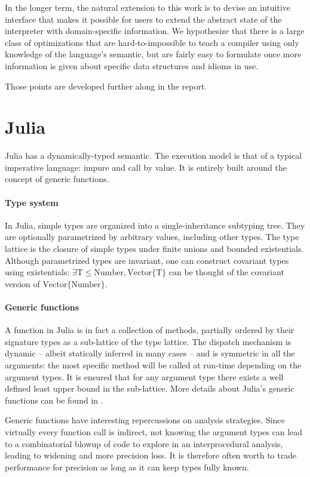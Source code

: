 \documentclass[11pt]{article}
\begin{document}
In the longer term, the natural extension to this work is to devise an intuitive interface that makes it possible for users to extend the abstract state of the interpreter with domain-specific information. We hypothesize that there is a large class of optimizations that are hard-to-impossible to teach a compiler using only knowledge of the language's semantic, but are fairly easy to formulate once more information is given about specific data structures and idioms in use.

Those points are developed further along in the report.
\clearpage
\section*{Julia}
Julia has a dynamically-typed semantic. The execution model is that of a typical imperative language: impure and call by value. It is entirely built around the concept of generic functions.

\paragraph{Type system} In Julia, simple types are organized into a single-inheritance subtyping tree.
They are optionally parametrized by arbitrary values, including other types.
The type lattice is the closure of simple types under finite unions and bounded existentials.
Although parametrized types are invariant, one can construct covariant types using existentials: $\exists \text{T}\leq\text{Number}, \text{Vector}\{\text{T}\}$ can be thought of the covariant version of $\text{Vector}\{\text{Number}\}$.

\paragraph{Generic functions} A function in Julia is in fact a collection of methods, partially ordered by their signature types as a sub-lattice of the type lattice\cite{julia-paper}.
The dispatch mechanism is dynamic -- albeit statically inferred in many cases -- and is symmetric in all the arguments: the most specific method will be called at run-time depending on the argument types.
It is ensured that for any argument type there exists a well defined least upper bound in the sub-lattice.
More details about Julia's generic functions can be found in \cite{julia-paper,jeff-phd}.

Generic functions have interesting repercussions on analysis strategies. Since virtually every function call is indirect, not knowing the argument types can lead to a combinatorial blowup of code to explore in an interprocedural analysis, leading to widening and more precision loss. It is therefore often worth to trade performance for precision as long as it can keep types fully known\cite{jeff-phd}.
\end{document}
